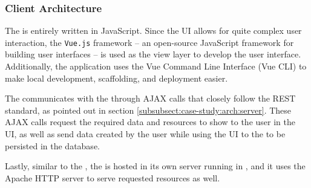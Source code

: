 \subsubsection{Client Architecture} \label{subsubsect:case-study:arch:client}

The \mlblinkui is entirely written in JavaScript. Since the UI allows for quite complex user interaction, the \texttt{Vue.js} framework \cite{software:vue} -- an open-source JavaScript framework for building user interfaces -- is used as the view layer to develop the user interface. Additionally, the application uses the Vue Command Line Interface (Vue CLI) to make local development, scaffolding, and deployment easier.

The \mlblinkui communicates with the \mlblinkapi through AJAX calls that closely follow the REST standard, as pointed out in section \ref{subsubsect:case-study:arch:server}. These AJAX calls request the required data and resources to show to the user in the UI, as well as send data created by the user while using the UI to the \mlblinkapi to be persisted in the database.

Lastly, similar to the \mlblinkapi, the \mlblinkui is hosted in its own server running in \ubuntu, and it uses the Apache HTTP server to serve requested resources as well.